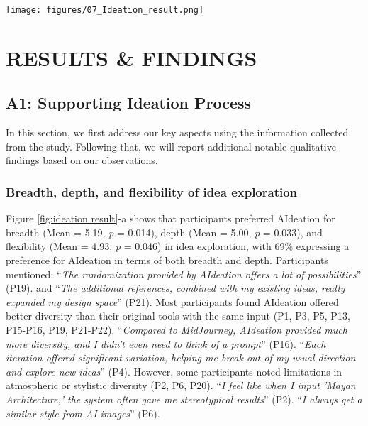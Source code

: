 
\begin{figure*}
    \centering
    \texttt{[image: figures/07\_Ideation\_result.png]}
    \caption{The distribution of user preference for baseline vs. AIdeation: (a) Preference rating on a 7-point Likert scale for idea Exploration; (b) Overall preference for Satisfaction, Enjoyment, Task Difficulty, and Task Efficiency}
    \label{fig:ideation result}
\end{figure*}

\section{RESULTS \& FINDINGS}
\subsection{A1: Supporting Ideation Process}
In this section, we first address our key aspects using the information collected from the study. Following that, we will report additional notable qualitative findings based on our observations.
\subsubsection{Breadth, depth, and flexibility of idea exploration
}
Figure \ref{fig:ideation result}-a shows that participants preferred AIdeation for breadth (Mean = 5.19, \textit{p} = 0.014), depth (Mean = 5.00, \textit{p} = 0.033), and flexibility (Mean = 4.93, \textit{p} = 0.046) in idea exploration, with 69\% expressing a preference for AIdeation in terms of both breadth and depth. Participants mentioned: “\textit{The randomization provided by AIdeation offers a lot of possibilities}” (P19). and “\textit{The additional references, combined with my existing ideas, really expanded my design space}” (P21). Most participants found AIdeation offered better diversity than their original tools with the same input (P1, P3, P5, P13, P15-P16, P19, P21-P22). “\textit{Compared to MidJourney, AIdeation provided much more diversity, and I didn't even need to think of a prompt}” (P16). “\textit{Each iteration offered significant variation, helping me break out of my usual direction and explore new ideas}” (P4). However, some participants noted limitations in atmospheric or stylistic diversity (P2, P6, P20). “\textit{I feel like when I input 'Mayan Architecture,' the system often gave me stereotypical results}” (P2). “\textit{I always get a similar style from AI images}” (P6).

